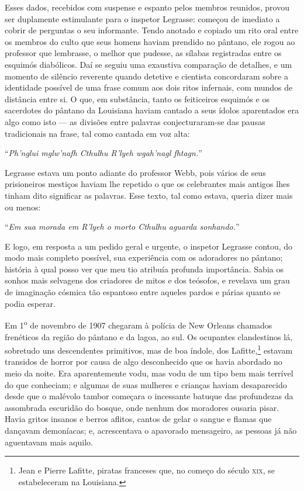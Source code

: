 Esses dados, recebidos com suspense e espanto pelos membros reunidos,
provou ser duplamente estimulante para o inspetor Legrasse: começou de
imediato a cobrir de perguntas o seu informante. Tendo anotado e copiado
um rito oral entre os membros do culto que seus homens haviam prendido
no pântano, ele rogou ao professor que lembrasse, o melhor que pudesse,
as sílabas registradas entre os esquimós diabólicos. Daí se seguiu uma
exaustiva comparação de detalhes, e um momento de silêncio reverente
quando detetive e cientista concordaram sobre a identidade possível de
uma frase comum aos dois ritos infernais, com mundos de distância entre
si. O que, em substância, tanto os feiticeiros esquimós e os sacerdotes
do pântano da Louisiana haviam cantado a seus ídolos aparentados era
algo como isto --- as divisões entre palavras conjecturaram-se das
pausas tradicionais na frase, tal como cantada em voz alta:

``\emph{Ph'nglui mglw'nafh Cthulhu R'lyeh wgah'nagl fhtagn.}''

Legrasse estava um ponto adiante do professor Webb, pois vários de
seus prisioneiros mestiços haviam lhe repetido o que os celebrantes mais antigos
lhes tinham dito significar as palavras. Esse texto, tal
como estava, queria dizer mais ou menos:


``\emph{Em sua morada em R'lyeh o morto Cthulhu aguarda sonhando.}''


E logo, em resposta a um pedido geral e urgente, o inspetor Legrasse
contou, do modo mais completo possível, sua experiência com os
adoradores no pântano; história à qual posso ver que meu tio atribuía
profunda importância. Sabia os sonhos mais selvagens dos criadores de
mitos e dos teósofos, e revelava um grau de imaginação cósmica tão
espantoso entre aqueles pardos e párias quanto se podia esperar.

Em 1\textsuperscript{o} de novembro de 1907 chegaram à polícia de
New Orleans chamados frenéticos da região do pântano e da lagoa, ao sul.
Os ocupantes clandestinos lá, sobretudo uns descendentes primitivos, mas
de boa índole, dos Lafitte,\footnote{Jean e Pierre Lafitte, piratas
  franceses que, no começo do século \textsc{xix}, se estabeleceram na Louisiana.}
estavam transidos de horror por causa de algo desconhecido que os havia
abordado no meio da noite. Era aparentemente vodu, mas vodu de um tipo
bem mais terrível do que conheciam; e algumas de suas mulheres e
crianças haviam desaparecido desde que o malévolo tambor começara o
incessante batuque das profundezas da assombrada escuridão do bosque,
onde nenhum dos moradores ousaria pisar. Havia gritos insanos e berros
aflitos, cantos de gelar o sangue e flamas que dançavam demoníacas; e,
acrescentava o apavorado mensageiro, as pessoas já não aguentavam mais
aquilo.


